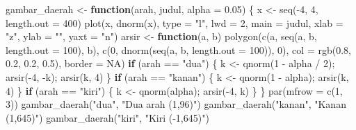 \documentclass[
  indonesian,
  letterpaper,
]{book}
\newenvironment{Shaded}{\begin{snugshade}}{\end{snugshade}}
\newcommand{\AttributeTok}[1]{\textcolor[rgb]{0.40,0.45,0.13}{#1}}
\newcommand{\ConstantTok}[1]{\textcolor[rgb]{0.56,0.35,0.01}{#1}}
\newcommand{\ControlFlowTok}[1]{\textcolor[rgb]{0.00,0.23,0.31}{\textbf{#1}}}
\newcommand{\DecValTok}[1]{\textcolor[rgb]{0.68,0.00,0.00}{#1}}
\newcommand{\FloatTok}[1]{\textcolor[rgb]{0.68,0.00,0.00}{#1}}
\newcommand{\FunctionTok}[1]{\textcolor[rgb]{0.28,0.35,0.67}{#1}}
\newcommand{\NormalTok}[1]{\textcolor[rgb]{0.00,0.23,0.31}{#1}}
\newcommand{\OtherTok}[1]{\textcolor[rgb]{0.00,0.23,0.31}{#1}}
\newcommand{\SpecialCharTok}[1]{\textcolor[rgb]{0.37,0.37,0.37}{#1}}
\newcommand{\StringTok}[1]{\textcolor[rgb]{0.13,0.47,0.30}{#1}}
\begin{document}
\begin{Shaded}
\begin{Highlighting}[]
\NormalTok{gambar\_daerah }\OtherTok{\textless{}{-}} \ControlFlowTok{function}\NormalTok{(arah, judul, }\AttributeTok{alpha =} \FloatTok{0.05}\NormalTok{) \{}
\NormalTok{  x }\OtherTok{\textless{}{-}} \FunctionTok{seq}\NormalTok{(}\SpecialCharTok{{-}}\DecValTok{4}\NormalTok{, }\DecValTok{4}\NormalTok{, }\AttributeTok{length.out =} \DecValTok{400}\NormalTok{)}
  \FunctionTok{plot}\NormalTok{(x, }\FunctionTok{dnorm}\NormalTok{(x), }\AttributeTok{type =} \StringTok{"l"}\NormalTok{, }\AttributeTok{lwd =} \DecValTok{2}\NormalTok{, }\AttributeTok{main =}\NormalTok{ judul, }\AttributeTok{xlab =} \StringTok{"z"}\NormalTok{, }\AttributeTok{ylab =} \StringTok{""}\NormalTok{,}
       \AttributeTok{yaxt =} \StringTok{"n"}\NormalTok{)}
\NormalTok{  arsir }\OtherTok{\textless{}{-}} \ControlFlowTok{function}\NormalTok{(a, b) }\FunctionTok{polygon}\NormalTok{(}\FunctionTok{c}\NormalTok{(a, }\FunctionTok{seq}\NormalTok{(a, b, }\AttributeTok{length.out =} \DecValTok{100}\NormalTok{), b),}
                                  \FunctionTok{c}\NormalTok{(}\DecValTok{0}\NormalTok{, }\FunctionTok{dnorm}\NormalTok{(}\FunctionTok{seq}\NormalTok{(a, b, }\AttributeTok{length.out =} \DecValTok{100}\NormalTok{)), }\DecValTok{0}\NormalTok{),}
                                  \AttributeTok{col =} \FunctionTok{rgb}\NormalTok{(}\FloatTok{0.8}\NormalTok{, }\FloatTok{0.2}\NormalTok{, }\FloatTok{0.2}\NormalTok{, }\FloatTok{0.5}\NormalTok{), }\AttributeTok{border =} \ConstantTok{NA}\NormalTok{)}
  \ControlFlowTok{if}\NormalTok{ (arah }\SpecialCharTok{==} \StringTok{"dua"}\NormalTok{)   \{ k }\OtherTok{\textless{}{-}} \FunctionTok{qnorm}\NormalTok{(}\DecValTok{1} \SpecialCharTok{{-}}\NormalTok{ alpha }\SpecialCharTok{/} \DecValTok{2}\NormalTok{); }\FunctionTok{arsir}\NormalTok{(}\SpecialCharTok{{-}}\DecValTok{4}\NormalTok{, }\SpecialCharTok{{-}}\NormalTok{k); }\FunctionTok{arsir}\NormalTok{(k, }\DecValTok{4}\NormalTok{) \}}
  \ControlFlowTok{if}\NormalTok{ (arah }\SpecialCharTok{==} \StringTok{"kanan"}\NormalTok{) \{ k }\OtherTok{\textless{}{-}} \FunctionTok{qnorm}\NormalTok{(}\DecValTok{1} \SpecialCharTok{{-}}\NormalTok{ alpha); }\FunctionTok{arsir}\NormalTok{(k, }\DecValTok{4}\NormalTok{) \}}
  \ControlFlowTok{if}\NormalTok{ (arah }\SpecialCharTok{==} \StringTok{"kiri"}\NormalTok{)  \{ k }\OtherTok{\textless{}{-}} \FunctionTok{qnorm}\NormalTok{(alpha); }\FunctionTok{arsir}\NormalTok{(}\SpecialCharTok{{-}}\DecValTok{4}\NormalTok{, k) \}}
\NormalTok{\}}
\FunctionTok{par}\NormalTok{(}\AttributeTok{mfrow =} \FunctionTok{c}\NormalTok{(}\DecValTok{1}\NormalTok{, }\DecValTok{3}\NormalTok{))}
\FunctionTok{gambar\_daerah}\NormalTok{(}\StringTok{"dua"}\NormalTok{, }\StringTok{"Dua arah (1,96)"}\NormalTok{)}
\FunctionTok{gambar\_daerah}\NormalTok{(}\StringTok{"kanan"}\NormalTok{, }\StringTok{"Kanan (1,645)"}\NormalTok{)}
\FunctionTok{gambar\_daerah}\NormalTok{(}\StringTok{"kiri"}\NormalTok{, }\StringTok{"Kiri ({-}1,645)"}\NormalTok{)}
\end{Highlighting}
\end{Shaded}
\end{document}
